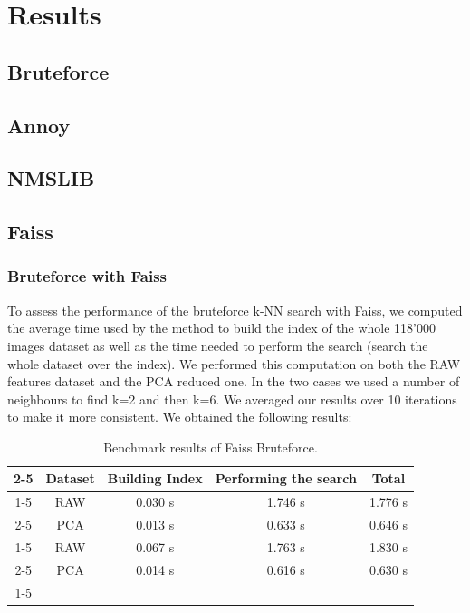 \documentclass[a4paper]{article}
\begin{document}
\section{Results}
	\subsection{Bruteforce}
	\subsection{Annoy}
	\subsection{NMSLIB}
	\subsection{Faiss}

\subsubsection{Bruteforce with Faiss}

To assess the performance of the bruteforce k-NN search with Faiss, we computed the average time used by the method to build the index of the whole 118'000 images dataset as well as the time needed to perform the search (search the whole dataset over the index). We performed this computation on both the RAW features dataset and the PCA reduced one. In the two cases we used a number of neighbours to find k=2 and then k=6. We averaged our results over 10 iterations to make it more consistent. We obtained the following results:

\begin{table}[h]
	\centering
	\begin{tabular}{ c | c | c | c | c |}
		\cline{2-5}
		& Dataset & Building Index & Performing the search & Total \\ \cline{1-5}
		\multicolumn{1}{ |c|  }{\multirow{2}{*}{k=2} } & RAW & 0.030 s & 1.746 s & 1.776 s \\ \cline{2-5}
		\multicolumn{1}{ |c|  }{} & PCA & 0.013 s & 0.633 s & 0.646 s \\ \cline{1-5}
		\multicolumn{1}{ |c|  }{\multirow{2}{*}{k=6} } & RAW & 0.067 s & 1.763 s & 1.830 s\\ \cline{2-5}
		\multicolumn{1}{ |c|  }{} & PCA & 0.014 s & 0.616 s & 0.630 s \\ \cline{1-5}
	\end{tabular}
	\caption{Benchmark results of Faiss Bruteforce.}
	\label{table:benchmark-faiss-bruteforce}
\end{table}
\end{document}
